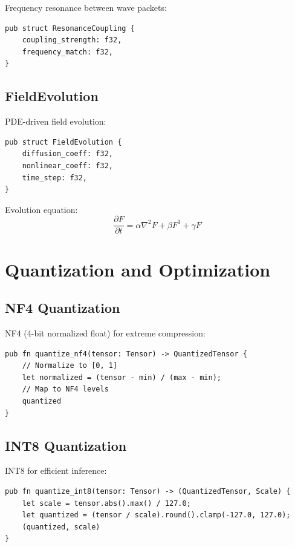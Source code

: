 \documentclass{article}
\begin{document}
Frequency resonance between wave packets:

\begin{verbatim}
pub struct ResonanceCoupling {
    coupling_strength: f32,
    frequency_match: f32,
}
\end{verbatim}

\subsection{FieldEvolution}

PDE-driven field evolution:

\begin{verbatim}
pub struct FieldEvolution {
    diffusion_coeff: f32,
    nonlinear_coeff: f32,
    time_step: f32,
}
\end{verbatim}

Evolution equation:
\begin{equation}
\frac{\partial F}{\partial t} = \alpha \nabla^2 F + \beta F^3 + \gamma F
\end{equation}

\section{Quantization and Optimization}

\subsection{NF4 Quantization}

NF4 (4-bit normalized float) for extreme compression:

\begin{verbatim}
pub fn quantize_nf4(tensor: Tensor) -> QuantizedTensor {
    // Normalize to [0, 1]
    let normalized = (tensor - min) / (max - min);
    // Map to NF4 levels
    quantized
}
\end{verbatim}

\subsection{INT8 Quantization}

INT8 for efficient inference:

\begin{verbatim}
pub fn quantize_int8(tensor: Tensor) -> (QuantizedTensor, Scale) {
    let scale = tensor.abs().max() / 127.0;
    let quantized = (tensor / scale).round().clamp(-127.0, 127.0);
    (quantized, scale)
}
\end{verbatim}
\end{document}
